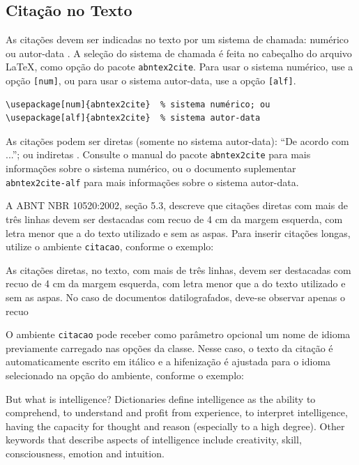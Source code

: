 \subsection{Citação no Texto}

As citações devem ser indicadas no texto por um sistema de chamada: numérico ou autor-data \cite{NBR6023}. A seleção do sistema de chamada é feita no cabeçalho do arquivo \LaTeX, como opção do pacote \texttt{abntex2cite}. Para usar o sistema numérico, use a opção \verb|[num]|, ou para usar o sistema autor-data, use a opção \verb|[alf]|.

\begin{verbatim}
\usepackage[num]{abntex2cite}  % sistema numérico; ou
\usepackage[alf]{abntex2cite}  % sistema autor-data
\end{verbatim}

As citações podem ser diretas (somente no sistema autor-data): ``De acordo com ...''; ou indiretas \cite{engelbrecht2007}. Consulte o manual do pacote \texttt{abntex2cite} \cite{abntex2cite} para mais informações sobre o sistema numérico, ou o documento suplementar \texttt{abntex2cite-alf} \cite{abntex2cite-alf} para mais informações sobre o sistema autor-data.

A ABNT NBR 10520:2002, seção 5.3, descreve que citações diretas com mais de três linhas devem ser destacadas com recuo de 4 cm da margem esquerda, com letra menor que a do texto utilizado e sem as aspas. Para inserir citações longas, utilize o ambiente \texttt{citacao}, conforme o exemplo:

\begin{citacao}
As citações diretas, no texto, com mais de três linhas, devem ser destacadas com recuo de 4 cm da margem esquerda, com letra menor que a do texto utilizado e sem as aspas. No caso de documentos datilografados, deve-se observar apenas o recuo \cite[5.3]{NBR10520}
\end{citacao}

O ambiente \texttt{citacao} pode receber como parâmetro opcional um nome de idioma previamente carregado nas opções da classe. Nesse caso, o texto da citação é automaticamente escrito em itálico e a hifenização é ajustada para o idioma selecionado na opção do ambiente, conforme o exemplo:

\begin{citacao}[english]
But what is intelligence? Dictionaries define intelligence as the ability to comprehend, to understand and profit from experience, to interpret intelligence, having the capacity for thought and reason (especially to a high degree). Other keywords that describe aspects of intelligence include creativity, skill, consciousness, emotion and intuition. \cite{engelbrecht2007}
\end{citacao}

